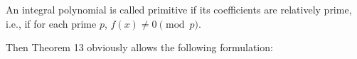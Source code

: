 An integral polynomial is called primitive if its coefficients are relatively prime, i.e., if for each prime $p$, $f(x) \neq 0 \pmod{p}$.

Then Theorem 13 obviously allows the following formulation:
